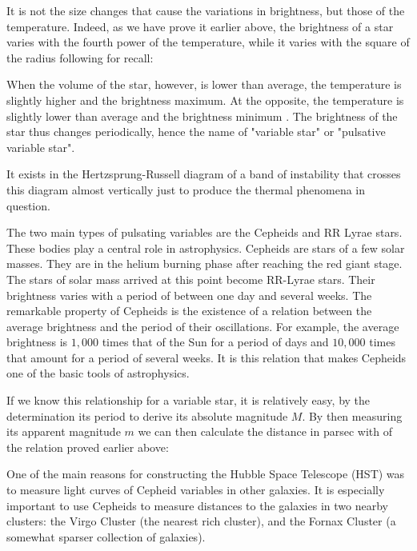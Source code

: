 	It is not the size changes that cause the variations in brightness, but those of the temperature. Indeed, as we have prove it earlier above, the brightness of a star varies with the fourth power of the temperature, while it varies with the square of the radius following for recall:
	
	When the volume of the star, however, is lower than average, the temperature is slightly higher and the brightness maximum. At the opposite, the temperature is slightly lower than average and the brightness minimum . The brightness of the star thus changes periodically, hence the name of "variable star" or "pulsative variable star".

	It exists in the Hertzsprung-Russell diagram of a band of instability that crosses this diagram almost vertically just to produce the thermal phenomena in question.

	The two main types of pulsating variables are the Cepheids and RR Lyrae stars. These bodies play a central role in astrophysics. Cepheids are stars of a few solar masses. They are in the helium burning phase after reaching the red giant stage. The stars of solar mass arrived at this point become RR-Lyrae stars. Their brightness varies with a period of between one day and several weeks. The remarkable property of Cepheids is the existence of a relation between the average brightness and the period of their oscillations. For example, the average brightness is $1,000$ times that of the Sun for a period of days and $10,000$ times that amount for a period of several weeks. It is this relation that makes Cepheids one of the basic tools of astrophysics.
	
	If we know this relationship for a variable star, it is relatively easy, by the determination its period to derive its absolute magnitude $M$. By then measuring its apparent magnitude $m$ we can then calculate the distance in parsec with of the relation proved earlier above:
	
	
	One of the main reasons for constructing the Hubble Space Telescope (HST) was to measure light curves of Cepheid variables in other galaxies. It is especially important to use Cepheids to measure distances to the galaxies in two nearby clusters: the Virgo Cluster (the nearest rich cluster), and the Fornax Cluster (a somewhat sparser collection of galaxies).

